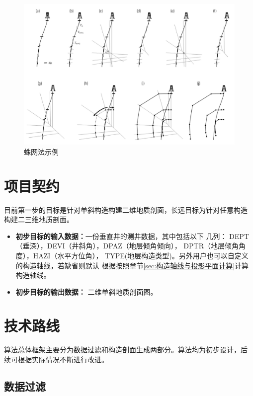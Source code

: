 \documentclass[a4paper,twoside]{ctexart}
\begin{document}
 \begin{figure}[htbp]
  \centering
    \includegraphics[width=\textwidth]{pic/蛛网法.png}
  \caption{蛛网法示例}
  \label{fig:蛛网法}
\end{figure}


\section{项目契约}

目前第一步的目标是针对单斜构造构建二维地质剖面，长远目标为针对任意构造
构建二三维地质剖面。

\begin{itemize}
\item \textbf{初步目标的输入数据：}一份垂直井的测井数据，其中包括以下
  几列：
  DEPT（垂深），DEVI（井斜角），DPAZ（地层倾角倾向），
  DPTR（地层倾角角度），HAZI（水平方位角），
  TYPE(地层构造类型)。另外用户也可以自定义的构造轴线，若缺省则默认
  根据按照章节\ref{sec:构造轴线与投影平面计算}计算构造轴线。
\item \textbf{初步目标的输出数据：} 二维单斜地质剖面图。
\end{itemize}

\section{技术路线}

算法总体框架主要分为数据过滤和构造剖面生成两部分。算法均为初步设计，后
续可根据实际情况不断进行改进。

\subsection{数据过滤}
\end{document}
